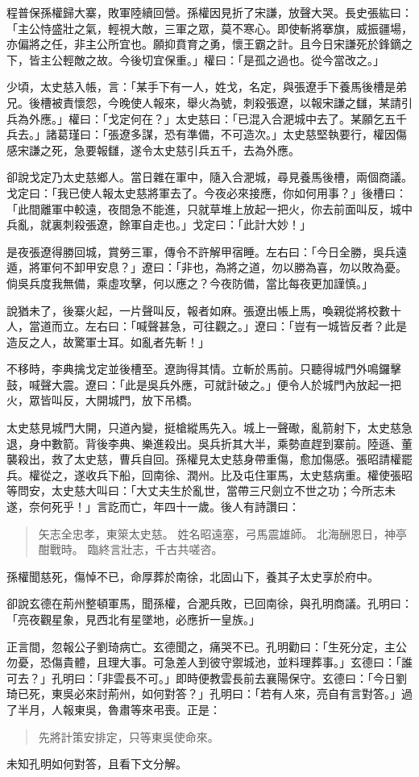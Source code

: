 程普保孫權歸大寨，敗軍陸續回營。孫權因見折了宋謙，放聲大哭。長史張紘曰：「主公恃盛壯之氣，輕視大敵，三軍之眾，莫不寒心。即使斬將搴旗，威振疆場，亦偏將之任，非主公所宜也。願抑賁育之勇，懷王霸之計。且今日宋謙死於鋒鏑之下，皆主公輕敵之故。今後切宜保重。」權曰：「是孤之過也。從今當改之。」

少頃，太史慈入帳，言：「某手下有一人，姓戈，名定，與張遼手下養馬後槽是弟兄。後槽被責懷怨，今晚使人報來，舉火為號，刺殺張遼，以報宋謙之讎，某請引兵為外應。」權曰：「戈定何在？」太史慈曰：「已混入合淝城中去了。某願乞五千兵去。」諸葛瑾曰：「張遼多謀，恐有準備，不可造次。」太史慈堅執要行，權因傷感宋謙之死，急要報讎，遂令太史慈引兵五千，去為外應。

卻說戈定乃太史慈鄉人。當日雜在軍中，隨入合淝城，尋見養馬後槽，兩個商議。戈定曰：「我已使人報太史慈將軍去了。今夜必來接應，你如何用事？」後槽曰：「此間離軍中較遠，夜間急不能進，只就草堆上放起一把火，你去前面叫反，城中兵亂，就裏刺殺張遼，餘軍自走也。」戈定曰：「此計大妙！」

是夜張遼得勝回城，賞勞三軍，傳令不許解甲宿睡。左右曰：「今日全勝，吳兵遠遁，將軍何不卸甲安息？」遼曰：「非也，為將之道，勿以勝為喜，勿以敗為憂。倘吳兵度我無備，乘虛攻擊，何以應之？今夜防備，當比每夜更加謹慎。」

說猶未了，後寨火起，一片聲叫反，報者如麻。張遼出帳上馬，喚親從將校數十人，當道而立。左右曰：「喊聲甚急，可往觀之。」遼曰：「豈有一城皆反者？此是造反之人，故驚軍士耳。如亂者先斬！」

不移時，李典擒戈定並後槽至。遼詢得其情。立斬於馬前。只聽得城門外鳴鑼擊鼓，喊聲大震。遼曰：「此是吳兵外應，可就計破之。」便令人於城門內放起一把火，眾皆叫反，大開城門，放下吊橋。

太史慈見城門大開，只道內變，挺槍縱馬先入。城上一聲礮，亂箭射下，太史慈急退，身中數箭。背後李典、樂進殺出。吳兵折其大半，乘勢直趕到寨前。陸遜、董襲殺出，救了太史慈，曹兵自回。孫權見太史慈身帶重傷，愈加傷感。張昭請權罷兵。權從之，遂收兵下船，回南徐、潤州。比及屯住軍馬，太史慈病重。權使張昭等問安，太史慈大叫曰：「大丈夫生於亂世，當帶三尺劍立不世之功；今所志未遂，奈何死乎！」言訖而亡，年四十一歲。後人有詩讚曰：

\begin{quote}
矢志全忠孝，東箂太史慈。
姓名昭遠塞，弓馬震雄師。
北海酬恩日，神亭酣戰時。
臨終言壯志，千古共嗟咨。
\end{quote}

孫權聞慈死，傷悼不已，命厚葬於南徐，北固山下，養其子太史享於府中。

卻說玄德在荊州整頓軍馬，聞孫權，合淝兵敗，已回南徐，與孔明商議。孔明曰：「亮夜觀星象，見西北有星墜地，必應折一皇族。」

正言間，忽報公子劉琦病亡。玄德聞之，痛哭不已。孔明勸曰：「生死分定，主公勿憂，恐傷貴體，且理大事。可急差人到彼守禦城池，並料理葬事。」玄德曰：「誰可去？」孔明曰：「非雲長不可。」即時便教雲長前去襄陽保守。玄德曰：「今日劉琦已死，東吳必來討荊州，如何對答？」孔明曰：「若有人來，亮自有言對答。」過了半月，人報東吳，魯肅等來弔喪。正是：

\begin{quote}
先將計策安排定，只等東吳使命來。
\end{quote}

未知孔明如何對答，且看下文分解。
